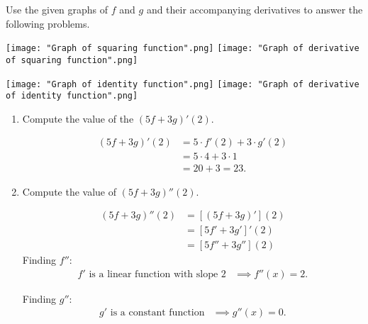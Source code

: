 \documentclass[nooutcomes, handout]{ximera}
\begin{document}
\begin{problem}

  Use the given graphs of $f$ and $g$ and their accompanying derivatives to answer the following problems.
  \begin{image}
    \hspace*{-7em}
     \texttt{[image: "Graph of squaring function".png]}
     \hspace{2em}
     \texttt{[image: "Graph of derivative of squaring function".png]}
   \end{image}
   \begin{image}
     \hspace*{-7em}
     \texttt{[image: "Graph of identity function".png]}
     \hspace{2em}
     \texttt{[image: "Graph of derivative of identity function".png]}
   \end{image}

   \begin{enumerate}
     \item
       Compute the value of the $(5f+3g)'(2)$.

       \begin{freeResponse}
         \begin{align*}
           (5f+3g)'(2) &= 5\cdot f'(2) + 3 \cdot g'(2)\\
                       &= 5 \cdot 4 + 3 \cdot 1 \\
                       &= 20 + 3 = 23.
         \end{align*}
       \end{freeResponse}


     \item
       Compute the value of $(5f+3g)''(2)$.
       \begin{freeResponse}
         \begin{align*}
		(5f+3g)''(2)&=[(5f+3g)'](2)\\
		&=[5f'+3g']'(2)\\
		&=[5f''+3g''](2)
	\end{align*}
	Finding $f''$:
         \begin{align*}
           \mbox{$f'$ is a linear function with slope 2} &\implies f''(x) = 2.
         \end{align*}

         Finding $g''$:
         \begin{align*}
           \mbox{$g'$ is a constant function} &\implies g''(x) = 0.
         \end{align*}
         

\end{freeResponse}
\end{enumerate}
\end{problem}
\end{document}
